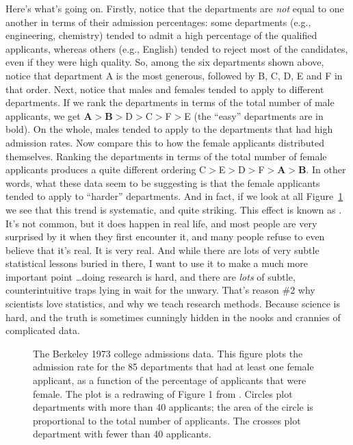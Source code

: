 Here's what's going on. Firstly, notice that the departments are {\it not} equal to one another in terms of their admission percentages: some departments (e.g., engineering, chemistry) tended to admit a high percentage of the qualified applicants, whereas others (e.g., English) tended to reject most of the candidates, even if they were high quality. So, among the six departments shown above, notice that department A is the most generous, followed by B, C, D, E and F in that order. Next, notice that males and females tended to apply to different departments. If we rank the departments in terms of the total number of male applicants, we get {\bf A}$>${\bf B}$>$D$>$C$>$F$>$E (the ``easy'' departments are in bold). On the whole, males tended to apply to the departments that had high admission rates. Now compare this to how the female applicants distributed themselves. Ranking the departments in terms of the total number of female applicants produces a quite different ordering C$>$E$>$D$>$F$>${\bf A}$>${\bf B}. In other words, what these data seem to be suggesting is that the female applicants tended to apply to ``harder'' departments. And in fact, if we look at all Figure~\ref{fig:berkeley} we see that this trend is systematic, and quite striking. This effect is known as . It's not common, but it does happen in real life, and most people are very surprised by it when they first encounter it, and many people refuse to even believe that it's real. It is very real. And while there are lots of very subtle statistical lessons buried in there, I want to use it to make a much more important point \ldots doing research is hard, and there are {\it lots} of subtle, counterintuitive traps lying in wait for the unwary.  That's reason \#2 why scientists love statistics, and why we teach research methods. Because science is hard, and the truth is sometimes cunningly hidden in the nooks and crannies of complicated data.


\begin{figure}[t!]
\begin{center}
\caption{The Berkeley 1973 college admissions data. This figure plots the admission rate for the 85 departments that had at least one female applicant, as a function of the percentage of applicants that were female. The plot is a redrawing of Figure 1 from \protect{}. Circles plot departments with more than 40 applicants; the area of the circle is proportional to the total number of applicants. The crosses plot department with fewer than 40 applicants.}  
\label{fig:berkeley}
\HR
\end{center}
\end{figure}

